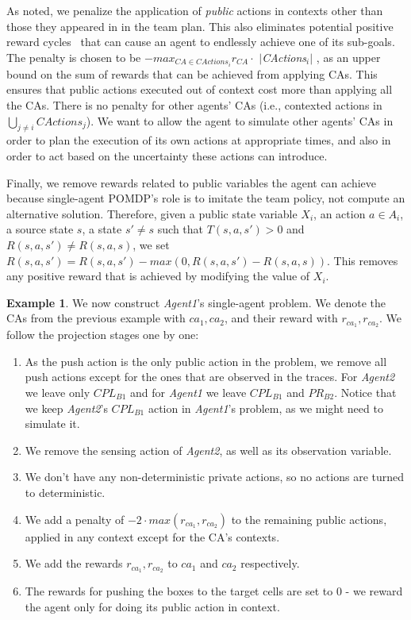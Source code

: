 \documentclass[letterpaper]{article} %
\theoremstyle{definition}
\newtheorem{example}{Example}
\newcommand{\eliran}[1]{\textbf{[\color{red}ELIRAN:#1]}}
\newcommand{\ronen}[1]{\textbf{[\color{blue}RONEN:#1]}}
\newcommand{\cact}[1]{{\em CActions$_#1$}}
\newcommand{\mcact}[1]{{\mathit{CActions}_#1}}
\begin{document}
As noted, we penalize the application of \emph{public} actions in contexts other
than those they appeared in in the team plan. This also eliminates 
potential positive reward cycles~\cite{RLCYCLES} that can cause an agent to endlessly achieve one of its sub-goals. 
%
The penalty is chosen to be $-max_{CA \in \mcact{i}}r_{CA} \cdot$ $|$\cact{i}$|$
, as an upper bound on the sum of rewards that can be achieved from applying CAs. This ensures that public actions executed out of context cost more than applying all the CAs. There is no penalty for other agents' CAs
(i.e., contexted actions in $\bigcup_{j\neq i} \mcact{j}$). We want
to allow the agent to simulate other agents' CAs in order to plan the execution of its own actions at appropriate times, and also in order to act based on the uncertainty these actions can introduce.

Finally, we remove rewards related to public variables the agent
can achieve because single-agent POMDP's role is to imitate the team policy, not compute an alternative solution.
Therefore, given a public state variable $X_i$, an action $a \in A_i$, a source state $s$, a state $s' \neq s$ such that $T(s,a,s')>0$ and $R(s, a, s')\neq R(s, a, s)$, we set $R(s,a,s') = R(s,a,s') - \textit{max}\left(0, R(s,a,s') - R(s,a,s)\right)$. This removes any positive reward that is achieved by modifying the value of $X_i$.

\begin{example}
We now construct \emph{Agent1}'s single-agent problem. We denote the CAs from the previous example with $ca_1, ca_2$, and their reward with $r_{ca_1}, r_{ca_2}$. We follow the projection stages one by one:
\begin{enumerate}
    \item As the push action is the only public action in the problem, we remove all push actions except for the ones that are observed in the traces. For \emph{Agent2} we leave only $CPL_{B1}$ and for \emph{Agent1} we leave $CPL_{B1}$ and $PR_{B2}$. Notice that we keep \emph{Agent2}'s $CPL_{B1}$ action in \emph{Agent1}'s problem, as we might need to simulate it.
    \item We remove the sensing action of \emph{Agent2}, as well as its observation variable.
    \item We don't have any non-deterministic private actions, so no actions are turned to deterministic.
    \item We add a penalty of $-2\cdot max(r_{ca_1}, r_{ca_2})$ to the remaining public actions, applied in any context except for the CA's contexts.
    \item We add the rewards $r_{ca_1}, r_{ca_2}$ to  $ca_1$ and $ca_2$ respectively.
    \item The rewards for pushing the boxes to the target cells are set to 0 - we reward the agent only for doing its public action in context.
\end{enumerate}
\end{example}
\end{document}
